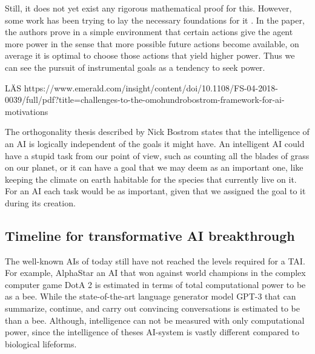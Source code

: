 \documentclass[12pt,A4]{report}
\theoremstyle{definition}
\begin{document}
Still, it does not yet exist any rigorous mathematical proof for this. However, some work has been trying to lay the necessary foundations for it \autocite{TURNER et al.}. In the paper, the authors prove in a simple environment that certain actions give the agent more power in the sense that more possible future actions become available, on average it is optimal to choose those actions that yield higher power. Thus we can see the pursuit of instrumental goals as a tendency to seek power.

LÄS
https://www.emerald.com/insight/content/doi/10.1108/FS-04-2018-0039/full/pdf?title=challenges-to-the-omohundrobostrom-framework-for-ai-motivations

The orthogonality thesis described by Nick Bostrom\cite{Bostrom2} states that the intelligence of an AI is logically independent of the goals it might have. An intelligent AI could have a stupid task from our point of view, such as counting all the blades of grass on our planet, or it can have a goal that we may deem as an important one, like keeping the climate on earth habitable for the species that currently live on it. For an AI each task would be as important, given that we assigned the goal to it during its creation.



\subsection{Timeline for transformative AI breakthrough}
The well-known AIs of today still have not reached the levels required for a TAI. For example, AlphaStar an AI that won against world champions in the complex computer game DotA 2\autocite{Deepmind} is estimated in terms of total computational power to be  as a bee\autocite{A Cotra}. While the state-of-the-art language generator model GPT-3 that can summarize, continue, and carry out convincing conversations is estimated to be  than a bee\autocite{A Cotra}. Although, intelligence can not be measured with only computational power, since the intelligence of theses AI-system is vastly different compared to biological lifeforms. 
\end{document}
